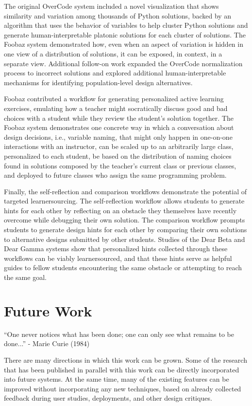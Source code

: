 \documentclass[12pt,twoside]{mitthesis}
\begin{document}
The original OverCode system included a novel visualization that shows similarity and variation among thousands of Python solutions, backed by an algorithm that uses the behavior of variables to help cluster Python solutions and generate human-interpretable platonic solutions for each cluster of solutions. The Foobaz system demonstrated how, even when an aspect of variation is hidden in one view of a distribution of solutions, it can be exposed, in context, in a separate view. Additional follow-on work expanded the OverCode normalization process to incorrect solutions and explored additional human-interpretable mechanisms for identifying population-level design alternatives.

Foobaz contributed a workflow for generating personalized active learning exercises, emulating how a teacher might socratically discuss good and bad choices with a student while they review the student's solution together. The Foobaz system demonstrates one concrete way in which a conversation about design decisions, i.e., variable naming, that might only happen in one-on-one interactions with an instructor, can be scaled up to an arbitrarily large class, personalized to each student, be based on the distribution of naming choices found in solutions composed by the teacher's current class or previous classes, and deployed to future classes who assign the same programming problem.

Finally, the self-reflection and comparison workflows demonstrate the potential of targeted learnersourcing. The self-reflection workflow allows students to generate hints for each other by reflecting on an obstacle they themselves have recently overcome while debugging their own solution. The comparison workflow prompts students to generate design hints for each other by comparing their own solutions to alternative designs submitted by other students. Studies of the Dear Beta and Dear Gamma systems show that personalized hints collected through these workflows can be viably learnersourced, and that these hints serve as helpful guides to fellow students encountering the same obstacle or attempting to reach the same goal.

\section{Future Work}
``One never notices what has been done; one can only see what remains to be done...'' - Marie Curie (1984)

There are many directions in which this work can be grown. Some of the research that has been published in parallel with this work can be directly incorporated into future systems. At the same time, many of the existing features can be improved without incorporating any new techniques, based on already collected feedback during user studies, deployments, and other design critiques.
\end{document}
